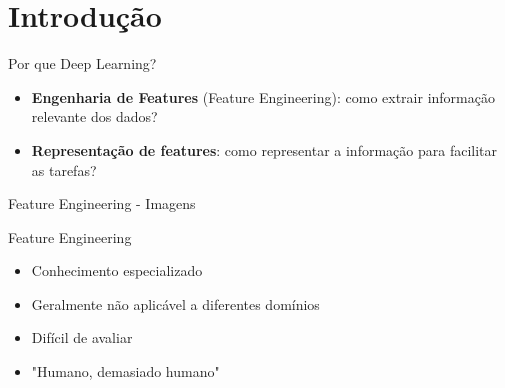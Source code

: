 \documentclass[10pt]{beamer}
\begin{document}
\nocite{DeepLearningbook}
\nocite{xiao2017/online}
\maketitle

\section{Introdução}
\begin{frame}[fragile]{Por que Deep Learning?}
\fontsize{12pt}{12}
\begin{itemize}
	\item \textbf{Engenharia de Features} (\alert{Feature Engineering}): como extrair informação relevante dos dados?
    \vspace{2em}
    \item \textbf{Representação de features}: como representar a informação para facilitar as tarefas?
\end{itemize}
\end{frame}
\begin{frame}[fragile]{Feature Engineering - Imagens}

\end{frame}

\begin{frame}[fragile]{Feature Engineering}
\fontsize{12pt}{12}
\begin{itemize}
	\item Conhecimento especializado
    \vspace{1em}
	\item Geralmente não aplicável a diferentes domínios
    \vspace{1em}
    \item Difícil de avaliar
    \vspace{1em}
	\item "Humano, demasiado humano"
\end{itemize}
\end{frame}
\end{document}
